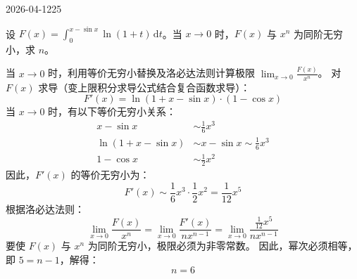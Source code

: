 \begin{mistake}{2026-04-12}{25}

\begin{problemcontent}
设 \( \displaystyle F(x)=\int_0^{x-\sin x}\ln(1+t)\,\mathrm{d}t \)。当 \( x\to 0 \) 时，\( F(x) \) 与 \( x^n \) 为同阶无穷小，求 \(n\)。
\end{problemcontent}

\begin{solutioncontent}
当 \(x\to 0\) 时，利用等价无穷小替换及洛必达法则计算极限 \(\lim_{x\to 0} \frac{F(x)}{x^n}\)。
对 \(F(x)\) 求导（变上限积分求导公式结合复合函数求导）：
\[
F'(x) = \ln(1 + x - \sin x) \cdot (1 - \cos x)
\]
当 \(x\to 0\) 时，有以下等价无穷小关系：
\[
\begin{aligned}
x - \sin x &\sim \frac{1}{6}x^3 \\
\ln(1 + x - \sin x) &\sim x - \sin x \sim \frac{1}{6}x^3 \\
1 - \cos x &\sim \frac{1}{2}x^2
\end{aligned}
\]
因此，\(F'(x)\) 的等价无穷小为：
\[
F'(x) \sim \frac{1}{6}x^3 \cdot \frac{1}{2}x^2 = \frac{1}{12}x^5
\]
根据洛必达法则：
\[
\lim_{x\to 0} \frac{F(x)}{x^n} = \lim_{x\to 0} \frac{F'(x)}{nx^{n-1}} = \lim_{x\to 0} \frac{\frac{1}{12}x^5}{nx^{n-1}}
\]
要使 \(F(x)\) 与 \(x^n\) 为同阶无穷小，极限必须为非零常数。
因此，幂次必须相等，即 \(5 = n-1\)，解得：
\[
n = 6
\]
\end{solutioncontent}


\end{mistake}
